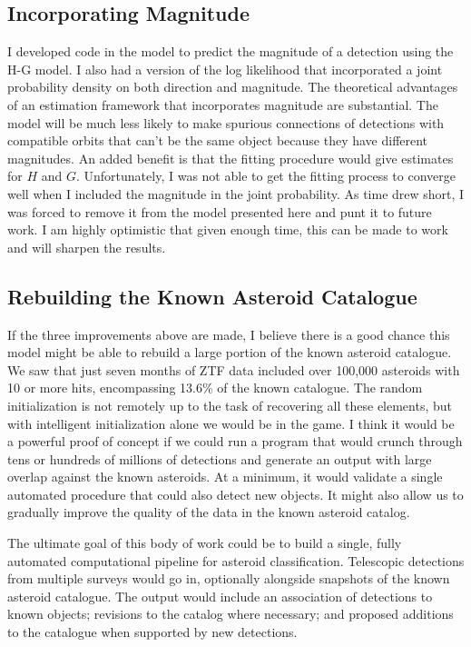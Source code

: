 \subsection{Incorporating Magnitude}
I developed code in the  model to predict the magnitude of a detection using the H-G model.
I also had a version of the log likelihood that incorporated a joint probability density on both direction and magnitude.
The theoretical advantages of an estimation framework that incorporates magnitude are substantial.
The model will be much less likely to make spurious connections of detections with compatible orbits
that can't be the same object because they have different magnitudes.
An added benefit is that the fitting procedure would give estimates for $H$ and $G$.
Unfortunately, I was not able to get the fitting process to converge well when I included the magnitude in the joint probability.
As time drew short, I was forced to remove it from the model presented here and punt it to future work.
I am highly optimistic that given enough time, this can be made to work and will sharpen the results.

\subsection{Rebuilding the Known Asteroid Catalogue}
If the three improvements above are made, I believe there is a good chance this model might be able to rebuild a large portion of the known asteroid catalogue.
We saw that just seven months of ZTF data included over 100,000 asteroids with 10 or more hits, encompassing 13.6\% of the known catalogue.
The random initialization is not remotely up to the task of recovering all these elements, but with intelligent initialization alone we would be in the game.
I think it would be a powerful proof of concept if we could run a program that would crunch through tens or hundreds of millions of detections and
generate an output with large overlap against the known asteroids.
At a minimum, it would validate a single automated procedure that could also detect new objects.
It might also allow us to gradually improve the quality of the data in the known asteroid catalog.

The ultimate goal of this body of work could be to build a single, fully automated computational pipeline for asteroid classification.
Telescopic detections from multiple surveys would go in, optionally alongside snapshots of the known asteroid catalogue.
The output would include an association of detections to known objects; revisions to the catalog where necessary; 
and proposed additions to the catalogue when supported by new detections.